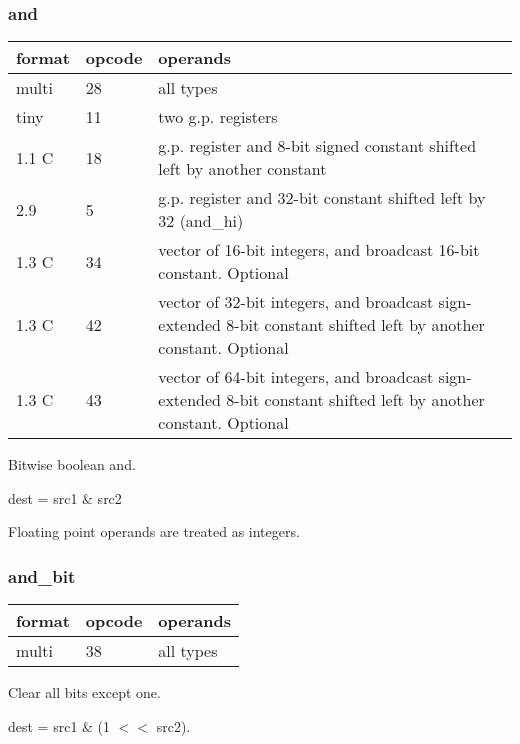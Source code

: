 \documentclass[forwardcom.tex]{subfiles}
\begin{document}
\subsubsection{and}
\label{table:andInstruction}
\begin{tabular}{|p{12mm}|p{12mm}|p{110mm}|}
\hline
\bfseries format & \bfseries opcode & \bfseries operands \\ \hline
multi & 28 & all types \\ \hline
tiny  & 11 & two g.p. registers \\ \hline
1.1 C & 18 & g.p. register and 8-bit signed constant shifted left by another constant \\ \hline
2.9   &  5 & g.p. register and 32-bit constant shifted left by 32 (and\_hi) \\ \hline
1.3 C & 34 & vector of 16-bit integers, and broadcast 16-bit constant. Optional \\ \hline
1.3 C & 42 & vector of 32-bit integers, and broadcast sign-extended 8-bit constant shifted left by another constant. Optional \\ \hline
1.3 C & 43 & vector of 64-bit integers, and broadcast sign-extended 8-bit constant shifted left by another constant. Optional \\ \hline
\end{tabular}
\vspace{2mm}

Bitwise boolean and.
\vspace{2mm}

dest = src1 \& src2
\vspace{2mm}

Floating point operands are treated as integers.

\subsubsection{and\_bit}
\label{table:andBitInstruction}
\begin{tabular}{|p{12mm}|p{12mm}|p{110mm}|}
\hline
\bfseries format & \bfseries opcode & \bfseries operands \\ \hline
multi & 38 & all types \\ \hline
\end{tabular}
\vspace{2mm}

Clear all bits except one. 
\vspace{2mm}

dest = src1 \& (1 $<<$ src2).
\end{document}
